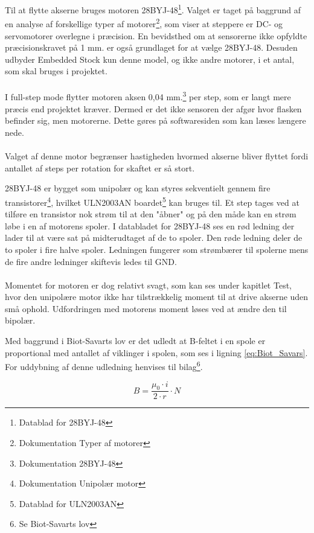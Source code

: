 Til at flytte akserne bruges motoren 28BYJ-48\footnote{Datablad for 28BYJ-48}. Valget er taget på baggrund af en analyse af forskellige typer af motorer\footnote{Dokumentation Typer af motorer}, som viser at steppere er DC- og servomotorer overlegne i præcision. En bevidsthed om at sensorerne ikke opfyldte præcisionskravet på 1 mm. er også grundlaget for at vælge 28BYJ-48. Desuden udbyder Embedded Stock kun denne model, og ikke andre motorer, i et antal, som skal bruges i projektet.
\\
\\
I full-step mode flytter motoren aksen 0,04 mm.\footnote{Dokumentation 28BYJ-48} per step, som er langt mere præcis end projektet kræver. Dermed er det ikke sensoren der afgør hvor flasken befinder sig, men motorerne. Dette gøres på softwaresiden som kan læses længere nede.
\\
\\
Valget af denne motor begrænser hastigheden hvormed akserne bliver flyttet fordi antallet af steps per rotation for skaftet er så stort.

28BYJ-48 er bygget som unipolær og kan styres sekventielt gennem fire transistorer\footnote{Dokumentation Unipolær motor}, hvilket ULN2003AN boardet\footnote{Datablad for ULN2003AN} kan bruges til. Et step tages ved at tilføre en transistor nok strøm til at den "åbner" og på den måde kan en strøm løbe i en af motorens spoler. I databladet for 28BYJ-48 ses en rød ledning der lader til at være sat på midterudtaget af de to spoler. Den røde ledning deler de to spoler i fire halve spoler. Ledningen fungerer som strømbærer til spolerne mens de fire andre ledninger skiftevis ledes til GND.
\\
\\
Momentet for motoren er dog relativt svagt, som kan ses under kapitlet Test, hvor den unipolære motor ikke har tilstrækkelig moment til at drive akserne uden små ophold. Udfordringen med motorens moment løses ved at ændre den til bipolær.

Med baggrund i Biot-Savarts lov er det udledt at B-feltet i en spole er proportional med antallet af viklinger i spolen, som ses i ligning \ref{eq:Biot_Savars}. For uddybning af denne udledning henvises til bilag\footnote{Se Biot-Savarts lov}.

\begin{equation} \label{eq:Biot_Savars}
	B = \frac{\mu_0 \cdot i}{2 \cdot r} \cdot N
\end{equation}

